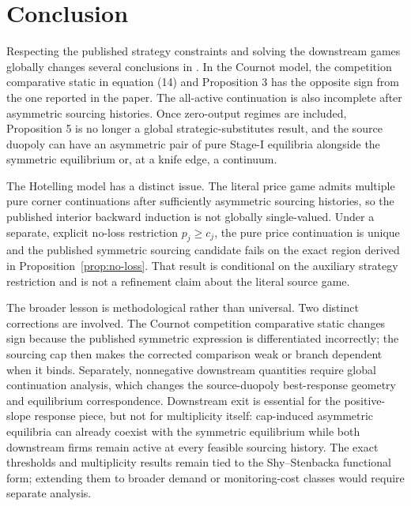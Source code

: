\section{Conclusion}
\label{sec:conclusion}

Respecting the published strategy constraints and solving the downstream games globally changes several conclusions in \cite{ShyStenbacka2005}.  In the Cournot model, the competition comparative static in equation (14) and Proposition 3 has the opposite sign from the one reported in the paper.  The all-active continuation is also incomplete after asymmetric sourcing histories.  Once zero-output regimes are included, Proposition 5 is no longer a global strategic-substitutes result, and the source duopoly can have an asymmetric pair of pure Stage-I equilibria alongside the symmetric equilibrium or, at a knife edge, a continuum.

The Hotelling model has a distinct issue.  The literal price game admits multiple pure corner continuations after sufficiently asymmetric sourcing histories, so the published interior backward induction is not globally single-valued.  Under a separate, explicit no-loss restriction \(p_j\ge c_j\), the pure price continuation is unique and the published symmetric sourcing candidate fails on the exact region derived in Proposition~\ref{prop:no-loss}.  That result is conditional on the auxiliary strategy restriction and is not a refinement claim about the literal source game.

The broader lesson is methodological rather than universal.  Two distinct corrections are involved.  The Cournot competition comparative static changes sign because the published symmetric expression is differentiated incorrectly; the sourcing cap then makes the corrected comparison weak or branch dependent when it binds.  Separately, nonnegative downstream quantities require global continuation analysis, which changes the source-duopoly best-response geometry and equilibrium correspondence.  Downstream exit is essential for the positive-slope response piece, but not for multiplicity itself: cap-induced asymmetric equilibria can already coexist with the symmetric equilibrium while both downstream firms remain active at every feasible sourcing history.  The exact thresholds and multiplicity results remain tied to the Shy--Stenbacka functional form; extending them to broader demand or monitoring-cost classes would require separate analysis.
